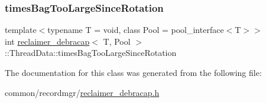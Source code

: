 \mbox{\label{classreclaimer__debracap_1_1ThreadData_ad14c2b8766f794f6c2c3ca426e0d932e}} 
\subsubsection{\texorpdfstring{times\+Bag\+Too\+Large\+Since\+Rotation}{timesBagTooLargeSinceRotation}}
{\footnotesize\ttfamily template$<$typename T  = void, class Pool  = pool\+\_\+interface$<$\+T$>$$>$ \\
int \hyperlink{classreclaimer__debracap}{reclaimer\+\_\+debracap}$<$ T, Pool $>$\+::Thread\+Data\+::times\+Bag\+Too\+Large\+Since\+Rotation}



The documentation for this class was generated from the following file\+:\begin{DoxyCompactItemize}
\item 
common/recordmgr/\hyperlink{reclaimer__debracap_8h}{reclaimer\+\_\+debracap.\+h}\end{DoxyCompactItemize}
